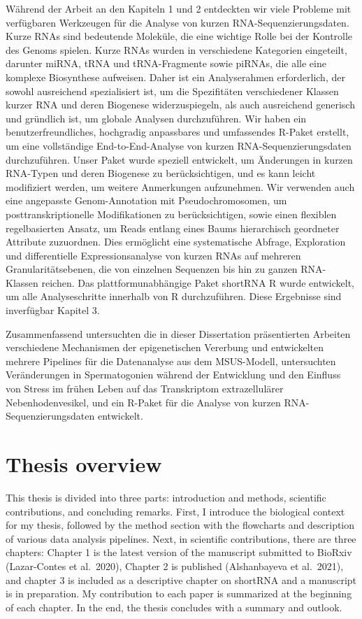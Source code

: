 \documentclass[12pt,twoside]{reedthesis}
\begin{document}
Während der Arbeit an den Kapiteln 1 und 2 entdeckten wir viele Probleme mit verfügbaren Werkzeugen für die Analyse von kurzen RNA-Sequenzierungsdaten. Kurze RNAs sind bedeutende Moleküle, die eine wichtige Rolle bei der Kontrolle des Genoms spielen. Kurze RNAs wurden in verschiedene Kategorien eingeteilt, darunter miRNA, tRNA und tRNA-Fragmente sowie piRNAs, die alle eine komplexe Biosynthese aufweisen. Daher ist ein Analyserahmen erforderlich, der sowohl ausreichend spezialisiert ist, um die Spezifitäten verschiedener Klassen kurzer RNA und deren Biogenese widerzuspiegeln, als auch ausreichend generisch und gründlich ist, um globale Analysen durchzuführen. Wir haben ein benutzerfreundliches, hochgradig anpassbares und umfassendes R-Paket erstellt, um eine vollständige End-to-End-Analyse von kurzen RNA-Sequenzierungsdaten durchzuführen. Unser Paket wurde speziell entwickelt, um Änderungen in kurzen RNA-Typen und deren Biogenese zu berücksichtigen, und es kann leicht modifiziert werden, um weitere Anmerkungen aufzunehmen. Wir verwenden auch eine angepasste Genom-Annotation mit Pseudochromosomen, um posttranskriptionelle Modifikationen zu berücksichtigen, sowie einen flexiblen regelbasierten Ansatz, um Reads entlang eines Baums hierarchisch geordneter Attribute zuzuordnen. Dies ermöglicht eine systematische Abfrage, Exploration und differentielle Expressionsanalyse von kurzen RNAs auf mehreren Granularitätsebenen, die von einzelnen Sequenzen bis hin zu ganzen RNA-Klassen reichen. Das plattformunabhängige Paket shortRNA R wurde entwickelt, um alle Analyseschritte innerhalb von R durchzuführen. Diese Ergebnisse sind inverfügbar Kapitel 3.

Zusammenfassend untersuchten die in dieser Dissertation präsentierten Arbeiten verschiedene Mechanismen der epigenetischen Vererbung und entwickelten mehrere Pipelines für die Datenanalyse aus dem MSUS-Modell, untersuchten Veränderungen in Spermatogonien während der Entwicklung und den Einfluss von Stress im frühen Leben auf das Transkriptom extrazellulärer Nebenhodenvesikel, und ein R-Paket für die Analyse von kurzen RNA-Sequenzierungsdaten entwickelt.

\hypertarget{overview}{%
\chapter*{Thesis overview}\label{overview}}

This thesis is divided into three parts: introduction and methods, scientific contributions, and concluding remarks. First, I introduce the biological context for my thesis, followed by the method section with the flowcharts and description of various data analysis pipelines. Next, in scientific contributions, there are three chapters: Chapter 1 is the latest version of the manuscript submitted to BioRxiv (Lazar-Contes et al.~2020), Chapter 2 is published (Alshanbayeva et al.~2021), and chapter 3 is included as a descriptive chapter on shortRNA and a manuscript is in preparation. My contribution to each paper is summarized at the beginning of each chapter. In the end, the thesis concludes with a summary and outlook.
\end{document}
